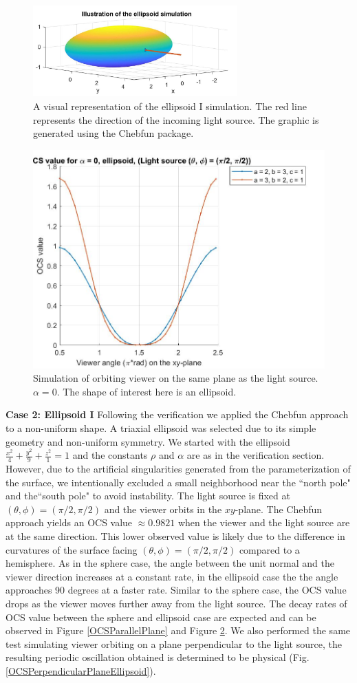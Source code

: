\documentclass[11pt,reqno]{amsart}
\theoremstyle{definition}
\begin{document}
\begin{figure}
\includegraphics[width=0.7\textwidth]{./figs/OCS_ellipsoid}
\caption{A visual representation of the ellipsoid I simulation. The red line represents the direction of the incoming light source. The graphic is generated using the Chebfun package.}
\label{OCSEllipsoid}
\end{figure}

\begin{figure}[h]
\includegraphics[width=.4\textwidth]{./figs/OCS_parallel_plane_ellipsoid}
\caption{Simulation of orbiting viewer on the same plane as the light source. $\alpha = 0$. The shape of interest here is an ellipsoid.}
\label{OCSParallelPlaneEllipsoid}
\end{figure}

{\bf Case 2: Ellipsoid I} Following the verification we applied the Chebfun approach to a non-uniform shape. A triaxial ellipsoid was selected due to its simple geometry and non-uniform symmetry. We started with the ellipsoid $\frac{x^2}{4}+\frac{y^2}{9}+\frac{z^2}{1} = 1$ and the constants $\rho$ and $\alpha$ are as in the verification section. However, due to the artificial singularities generated from the parameterization of the surface, we intentionally excluded a small neighborhood near the ``north pole" and the``south pole" to avoid instability. The light source is fixed at $(\theta,\phi) = (\pi/2, \pi/2)$ and the viewer orbits in the $xy$-plane. The Chebfun approach yields an OCS value $\approx 0.9821$ when the viewer and the light source are at the same direction. This lower observed value is likely due to the difference in curvatures of the surface facing $(\theta, \phi)=(\pi/2, \pi/2)$ compared to a hemisphere. As in the sphere case, the angle between the unit normal and the viewer direction increases at a constant rate, in the ellipsoid case the the angle approaches 90 degrees at a faster rate. Similar to the sphere case, the OCS value drops as the viewer moves further away from the light source. The decay rates of OCS value between the sphere and ellipsoid case are expected and can be observed in Figure \ref{OCSParallelPlane} and Figure \ref{OCSParallelPlaneEllipsoid}. We also performed the same test simulating viewer orbiting on a plane perpendicular to the light source, the resulting periodic oscillation obtained is determined to be physical (Fig. \ref{OCSPerpendicularPlaneEllipsoid}).
\end{document}
